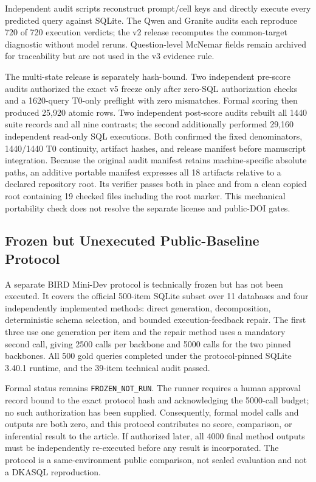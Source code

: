 \documentclass[applsci,article,submit,moreauthors]{Definitions/mdpi}
\begin{document}
Independent audit scripts reconstruct prompt/cell keys and directly execute every predicted query against SQLite. The Qwen and Granite audits each reproduce 720 of 720 execution verdicts; the v2 release recomputes the common-target diagnostic without model reruns. Question-level McNemar fields remain archived for traceability but are not used in the v3 evidence rule.

The multi-state release is separately hash-bound. Two independent pre-score audits authorized the exact v5 freeze only after zero-SQL authorization checks and a 1620-query T0-only preflight with zero mismatches. Formal scoring then produced 25,920 atomic rows. Two independent post-score audits rebuilt all 1440 suite records and all nine contrasts; the second additionally performed 29,160 independent read-only SQL executions. Both confirmed the fixed denominators, 1440/1440 T0 continuity, artifact hashes, and release manifest before manuscript integration. Because the original audit manifest retains machine-specific absolute paths, an additive portable manifest expresses all 18 artifacts relative to a declared repository root. Its verifier passes both in place and from a clean copied root containing 19 checked files including the root marker. This mechanical portability check does not resolve the separate license and public-DOI gates.

\subsection{Frozen but Unexecuted Public-Baseline Protocol}
A separate BIRD Mini-Dev protocol is technically frozen but has not been executed. It covers the official 500-item SQLite subset over 11 databases and four independently implemented methods: direct generation, decomposition, deterministic schema selection, and bounded execution-feedback repair. The first three use one generation per item and the repair method uses a mandatory second call, giving 2500 calls per backbone and 5000 calls for the two pinned backbones. All 500 gold queries completed under the protocol-pinned SQLite 3.40.1 runtime, and the 39-item technical audit passed.

Formal status remains \texttt{FROZEN\_NOT\_RUN}. The runner requires a human approval record bound to the exact protocol hash and acknowledging the 5000-call budget; no such authorization has been supplied. Consequently, formal model calls and outputs are both zero, and this protocol contributes no score, comparison, or inferential result to the article. If authorized later, all 4000 final method outputs must be independently re-executed before any result is incorporated. The protocol is a same-environment public comparison, not sealed evaluation and not a DKASQL reproduction.
\end{document}
